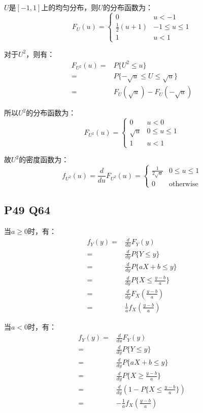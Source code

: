 \documentclass[a4paper,12pt]{ctexart}
\begin{document}
$U$是$[-1,1]$上的均匀分布，则$U$的分布函数为：
\begin{equation*}
	F_U(u) =
	\begin{cases}
		0 & u < -1 \\
		\frac{1}{2}(u + 1) & -1 \leq u \leq 1 \\
		1 & u < 1
	\end{cases}
\end{equation*}

对于$U^2$，则有：
\begin{align*}
	F_{U^2}(u) =& P\{U^2 \leq u\} \\
	=& P\{-\sqrt{u} \leq U \leq \sqrt{u}\} \\
	=& F_U(\sqrt{u}) - F_U(-\sqrt{u})
\end{align*}

所以$U^2$的分布函数为：
\begin{equation*}
	F_{U^2}(u) = 
	\begin{cases}
		0 & u < 0 \\
		\sqrt{u} & 0 \leq u \leq 1 \\
		1 & u < 1
	\end{cases}
\end{equation*}

故$U^2$的密度函数为：
\begin{equation*}
	f_{U^2}(u) = \frac{d}{du}F_{U^2}(u) =
	\begin{cases}
		\frac{1}{2\sqrt{u}} & 0 \leq u \leq 1 \\
		0 & \text{otherwise}
	\end{cases}
\end{equation*}

\subsection*{P49 Q64}

当$a \geq 0$时，有：
\begin{align*}
	f_Y(y) =& \frac{d}{du}F_Y(y) \\
	=& \frac{d}{dy}P\{Y \leq y\} \\
	=& \frac{d}{dy}P\{a X + b \leq y\} \\
	=& \frac{d}{dy}P\{X \leq \frac{y - b}{a}\} \\
	=& \frac{d}{dy}F_X(\frac{y - b}{a}) \\
	=& \frac{1}{a}f_X(\frac{y - b}{a})
\end{align*}

当$a < 0$时，有：
\begin{align*}
	f_Y(y) =& \frac{d}{du}F_Y(y) \\
	=& \frac{d}{dy}P\{Y \leq y\} \\
	=& \frac{d}{dy}P\{a X + b \leq y\} \\
	=& \frac{d}{dy}P\{X \geq \frac{y - b}{a}\} \\
	=& \frac{d}{dy}(1 - P\{X \leq \frac{y - b}{a}\}) \\
	=& -\frac{1}{a}f_X(\frac{y - b}{a})
\end{align*}
\end{document}
